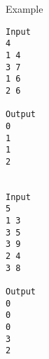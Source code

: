 Example
\begin{verbatim}
Input
4
1 4
3 7
1 6
2 6

Output
0
1
1
2


Input
5
1 3
3 5
3 9
2 4
3 8

Output
0
0
0
3
2
\end{verbatim}